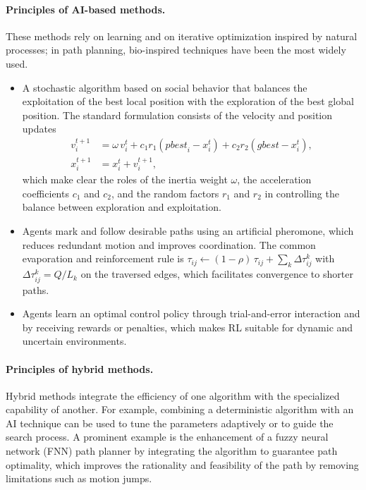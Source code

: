 \paragraph{Principles of AI-based methods.} These methods rely on learning and on
iterative optimization inspired by natural processes; in path planning,
bio-inspired techniques have been the most widely used.
\begin{itemize}
  \item {} A stochastic algorithm based on
        social behavior that balances the exploitation of the best local position
        with the exploration of the best global position. The standard
        formulation consists of the velocity and position updates
        \begin{equation}
          \begin{aligned}
            v_i^{t+1} &= \omega\, v_i^{t}
                         + c_1 r_1\left(\mathit{pbest}_i - x_i^{t}\right)
                         + c_2 r_2\left(\mathit{gbest} - x_i^{t}\right), \\
            x_i^{t+1} &= x_i^{t} + v_i^{t+1},
          \end{aligned}
          \label{eq:pso-summary}
        \end{equation}
        which make clear the roles of the inertia weight $\omega$, the
        acceleration coefficients $c_1$ and $c_2$, and the random factors $r_1$
        and $r_2$ in controlling the balance between exploration and
        exploitation.
  \item {} Agents mark and follow desirable
        paths using an artificial pheromone, which reduces redundant motion and
        improves coordination. The common evaporation and reinforcement rule is
        $\tau_{ij} \leftarrow (1-\rho)\,\tau_{ij} + \sum_{k} \Delta\tau_{ij}^{k}$
        with $\Delta\tau_{ij}^{k} = Q/L_k$ on the traversed edges, which
        facilitates convergence to shorter paths.
  \item {} Agents learn an optimal control policy
        through trial-and-error interaction and by receiving rewards or
        penalties, which makes RL suitable for dynamic and uncertain
        environments.
\end{itemize}

\paragraph{Principles of hybrid methods.} Hybrid methods integrate the efficiency
of one algorithm with the specialized capability of another. For example,
combining a deterministic algorithm with an AI technique can be used to tune the
parameters adaptively or to guide the search process. A prominent example is the
enhancement of a fuzzy neural network (FNN) path planner by integrating the
\Astar{} algorithm to guarantee path optimality, which improves the rationality
and feasibility of the path by removing limitations such as motion jumps.

